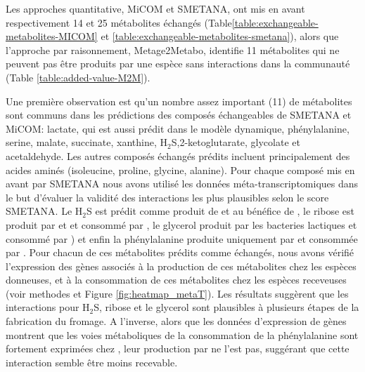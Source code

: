 Les approches quantitative, MiCOM et SMETANA, ont mis en avant respectivement 14 et 25 métabolites échangés (Table\ref{table:exchangeable-metabolites-MICOM} et \ref{table:exchangeable-metabolites-smetana}), alors que l'approche par raisonnement, Metage2Metabo, identifie 11 métabolites qui ne peuvent pas être produits par une espèce sans interactions dans la communauté (Table \ref{table:added-value-M2M}). 

Une première observation est qu'un nombre assez important (11) de métabolites sont communs dans les prédictions des composés échangeables de SMETANA et MiCOM: lactate, qui est aussi prédit dans le modèle dynamique, phénylalanine, serine, malate, succinate, xanthine, H${_2}$S,2-ketoglutarate, glycolate et acetaldehyde. Les autres composés échangés prédits incluent principalement des acides aminés (isoleucine, proline, glycine, alanine). Pour chaque composé mis en avant par SMETANA nous avons utilisé les données méta-transcriptomiques dans le but d'évaluer la validité des interactions les plus plausibles selon le score SMETANA. Le H${_2}$S est prédit comme produit de \lactis et \plantarum au bénéfice de \freud, le ribose est produit par \lactis et \plantarum et consommé par \freud, le glycerol produit par les bacteries lactiques et consommé par \freud) et enfin la phénylalanine produite uniquement par \plantarum et consommée par \freud. Pour chacun de ces métabolites prédits comme échangés, nous avons vérifié l'expression des gènes associés à la production de ces métabolites chez les espèces donneuses, et à la consommation de ces métabolites chez les espèces receveuses (voir methodes et Figure \ref{fig:heatmap_metaT}). Les résultats suggèrent que les interactions pour H${_2}$S, ribose et le glycerol sont plausibles à plusieurs étapes de la fabrication du fromage. A l'inverse, alors que les données d'expression de gènes montrent que les voies métaboliques de la consommation de la phénylalanine sont fortement exprimées chez \freud, leur production par \plantarum ne l'est pas, suggérant que cette interaction semble être moins recevable. 


